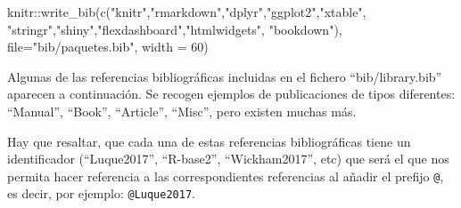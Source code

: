 \documentclass[12pt,a4paper,oneside,]{article}
\newenvironment{Shaded}{\begin{snugshade}}{\end{snugshade}}
\newcommand{\AttributeTok}[1]{\textcolor[rgb]{0.77,0.63,0.00}{#1}}
\newcommand{\DecValTok}[1]{\textcolor[rgb]{0.00,0.00,0.81}{#1}}
\newcommand{\FunctionTok}[1]{\textcolor[rgb]{0.00,0.00,0.00}{#1}}
\newcommand{\NormalTok}[1]{#1}
\newcommand{\SpecialCharTok}[1]{\textcolor[rgb]{0.00,0.00,0.00}{#1}}
\newcommand{\StringTok}[1]{\textcolor[rgb]{0.31,0.60,0.02}{#1}}
\numberwithin{dummy}{section}
\theoremstyle{ocrenumbox}
\theoremstyle{blacknumex}
\theoremstyle{blacknumbox}
\theoremstyle{ocrenum}
\theoremstyle{ocrenum}
\begin{document}
\bigskip

\begin{Shaded}
\begin{Highlighting}[]
\NormalTok{knitr}\SpecialCharTok{::}\FunctionTok{write\_bib}\NormalTok{(}\FunctionTok{c}\NormalTok{(}\StringTok{"knitr"}\NormalTok{,}\StringTok{"rmarkdown"}\NormalTok{,}\StringTok{"dplyr"}\NormalTok{,}\StringTok{"ggplot2"}\NormalTok{,}\StringTok{"xtable"}\NormalTok{,}
                   \StringTok{"stringr"}\NormalTok{,}\StringTok{"shiny"}\NormalTok{,}\StringTok{"flexdashboard"}\NormalTok{,}\StringTok{"htmlwidgets"}\NormalTok{,}
                   \StringTok{"bookdown"}\NormalTok{),}
                 \AttributeTok{file=}\StringTok{"bib/paquetes.bib"}\NormalTok{, }
                 \AttributeTok{width =} \DecValTok{60}\NormalTok{)}
\end{Highlighting}
\end{Shaded}

Algunas de las referencias bibliográficas incluidas en el fichero
``bib/library.bib'' aparecen a continuación. Se recogen ejemplos de
publicaciones de tipos diferentes: ``Manual'', ``Book'', ``Article'',
``Misc'', pero existen muchas más.

Hay que resaltar, que cada una de estas referencias bibliográficas tiene
un identificador (``Luque2017'', ``R-base2'', ``Wickham2017'', etc) que
será el que nos permita hacer referencia a las correspondientes
referencias al añadir el prefijo \texttt{@}, es decir, por ejemplo:
\texttt{@Luque2017}.
\end{document}
